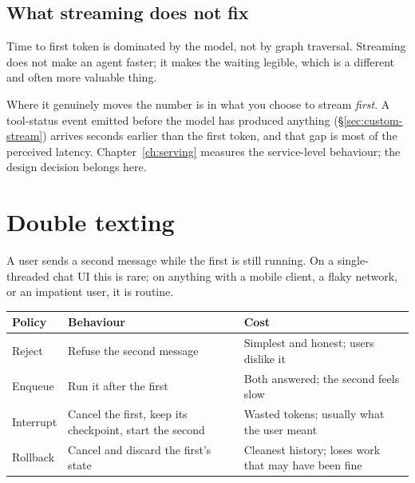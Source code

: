 \subsection{What streaming does not fix}
\label{sec:ttft}

Time to first token is dominated by the model, not by graph traversal. Streaming
does not make an agent faster; it makes the waiting legible, which is a different
and often more valuable thing.

Where it genuinely moves the number is in what you choose to stream \emph{first}.
A tool-status event emitted before the model has produced anything
(\S\ref{sec:custom-stream}) arrives seconds earlier than the first token, and
that gap is most of the perceived latency. Chapter~\ref{ch:serving} measures the
service-level behaviour; the design decision belongs here.

\section{Double texting}
\label{sec:double-texting}

A user sends a second message while the first is still running. On a
single-threaded chat UI this is rare; on anything with a mobile client, a flaky
network, or an impatient user, it is routine.


\begin{center}
\small
\begin{tabularx}{\linewidth}{@{}lXX@{}}
\toprule
\textbf{Policy} & \textbf{Behaviour} & \textbf{Cost} \\
\midrule
Reject & Refuse the second message & Simplest and honest; users dislike it \\[3pt]
Enqueue & Run it after the first & Both answered; the second feels slow \\[3pt]
Interrupt & Cancel the first, keep its checkpoint, start the second & Wasted
  tokens; usually what the user meant \\[3pt]
Rollback & Cancel and discard the first's state & Cleanest history; loses work
  that may have been fine \\
\bottomrule
\end{tabularx}
\end{center}

